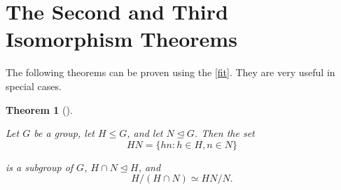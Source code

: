 \documentclass[10pt,]{book}
\theoremstyle{plain}
\newtheorem{theorem}{Theorem}[section]
\theoremstyle{definition}
\theoremstyle{definition}
\theoremstyle{definition}
\theoremstyle{definition}
\numberwithin{equation}{section}
\begin{document}
\section[{The Second and Third Isomorphism Theorems}]{The Second and Third Isomorphism Theorems}\label{section-29}

    The following theorems can be proven using the \hyperref[fit]{\ref{fit}}. They are very useful in special cases.
\begin{theorem}[{}]\label{sit}

 Let \(G\) be a
        group, let \(H\leq G\), and let \(N\unlhd G\). Then the set
\begin{equation*}

          HN=\{hn:h\in H, n\in N\}
        
\end{equation*}

        is a subgroup of \(G\), \(H\cap N\unlhd H\), and
\begin{equation*}

          H/(H\cap N) \simeq
          HN/N.
        
\end{equation*}

\end{theorem}
\end{document}

